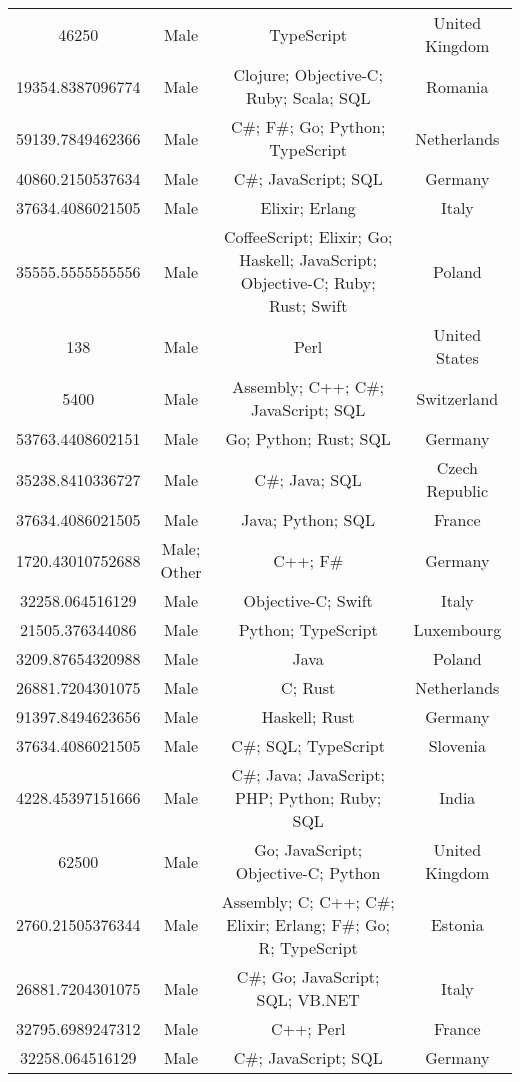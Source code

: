 \begin{center}
\begin{tabular}{ |c|c|c|c| }
46250  &  Male  &  TypeScript  &  United Kingdom  \\ 
19354.8387096774  &  Male  &  Clojure; Objective-C; Ruby; Scala; SQL  &  Romania  \\ 
59139.7849462366  &  Male  &  C\#; F\#; Go; Python; TypeScript  &  Netherlands  \\ 
40860.2150537634  &  Male  &  C\#; JavaScript; SQL  &  Germany  \\ 
37634.4086021505  &  Male  &  Elixir; Erlang  &  Italy  \\ 
35555.5555555556  &  Male  &  CoffeeScript; Elixir; Go; Haskell; JavaScript; Objective-C; Ruby; Rust; Swift  &  Poland  \\ 
138  &  Male  &  Perl  &  United States  \\ 
5400  &  Male  &  Assembly; C++; C\#; JavaScript; SQL  &  Switzerland  \\ 
53763.4408602151  &  Male  &  Go; Python; Rust; SQL  &  Germany  \\ 
35238.8410336727  &  Male  &  C\#; Java; SQL  &  Czech Republic  \\ 
37634.4086021505  &  Male  &  Java; Python; SQL  &  France  \\ 
1720.43010752688  &  Male; Other  &  C++; F\#  &  Germany  \\ 
32258.064516129  &  Male  &  Objective-C; Swift  &  Italy  \\ 
21505.376344086  &  Male  &  Python; TypeScript  &  Luxembourg  \\ 
3209.87654320988  &  Male  &  Java  &  Poland  \\ 
26881.7204301075  &  Male  &  C; Rust  &  Netherlands  \\ 
91397.8494623656  &  Male  &  Haskell; Rust  &  Germany  \\ 
37634.4086021505  &  Male  &  C\#; SQL; TypeScript  &  Slovenia  \\ 
4228.45397151666  &  Male  &  C\#; Java; JavaScript; PHP; Python; Ruby; SQL  &  India  \\ 
62500  &  Male  &  Go; JavaScript; Objective-C; Python  &  United Kingdom  \\ 
2760.21505376344  &  Male  &  Assembly; C; C++; C\#; Elixir; Erlang; F\#; Go; R; TypeScript  &  Estonia  \\ 
26881.7204301075  &  Male  &  C\#; Go; JavaScript; SQL; VB.NET  &  Italy  \\ 
32795.6989247312  &  Male  &  C++; Perl  &  France  \\ 
32258.064516129  &  Male  &  C\#; JavaScript; SQL  &  Germany  \\ 

\end{tabular}
\end{center}
